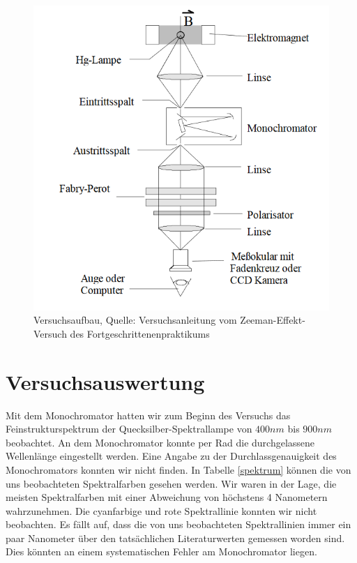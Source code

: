 \documentclass[10pt,a4paper]{article}
\begin{document}
\begin{figure}[h]
	\includegraphics[scale = 1]{Zeeman_aufbau.png}
	\centering
	\caption{Versuchsaufbau, Quelle: Versuchsanleitung vom Zeeman-Effekt-Versuch des Fortgeschrittenenpraktikums}
	\label{aufbau}
\end{figure}

\section{Versuchsauswertung}

Mit dem Monochromator hatten wir zum Beginn des Versuchs das Feinstrukturspektrum der Quecksilber-Spektrallampe von $400nm$
bis $900nm$ beobachtet. An dem Monochromator konnte per Rad die durchgelassene Wellenlänge eingestellt werden. Eine Angabe zu der Durchlassgenauigkeit des Monochromators konnten wir nicht finden. In Tabelle \ref{spektrum} können die von uns beobachteten Spektralfarben gesehen werden. Wir waren in der Lage, die meisten Spektralfarben mit einer Abweichung von höchstens 4 Nanometern wahrzunehmen. Die cyanfarbige und rote Spektrallinie konnten wir nicht beobachten. Es fällt auf, dass die von uns beobachteten Spektrallinien immer ein paar Nanometer über den tatsächlichen Literaturwerten gemessen worden sind. Dies könnten an einem systematischen Fehler am Monochromator liegen.
\end{document}

